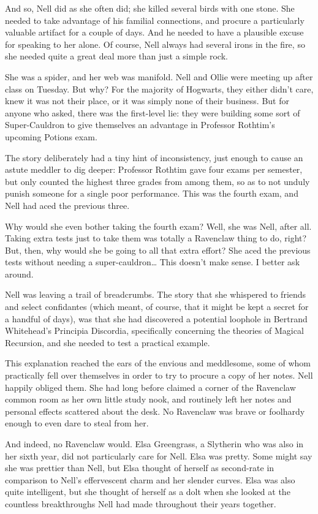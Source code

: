 And so, Nell did as she often did; she killed several birds with one stone. She needed to take advantage of his familial connections, and procure a particularly valuable artifact for a couple of days. And he needed to have a plausible excuse for speaking to her alone. Of course, Nell always had several irons in the fire, so she needed quite a great deal more than just a simple rock.

She was a spider, and her web was manifold. Nell and Ollie were meeting up after class on Tuesday. But why? For the majority of Hogwarts, they either didn’t care, knew it was not their place, or it was simply none of their business. But for anyone who asked, there was the first-level lie: they were building some sort of Super-Cauldron to give themselves an advantage in Professor Rothtim’s upcoming Potions exam.

The story deliberately had a tiny hint of inconsistency, just enough to cause an astute meddler to dig deeper: Professor Rothtim gave four exams per semester, but only counted the highest three grades from among them, so as to not unduly punish someone for a single poor performance. This was the fourth exam, and Nell had aced the previous three.

Why would she even bother taking the fourth exam? Well, she was Nell, after all. Taking extra tests just to take them was totally a Ravenclaw thing to do, right? But, then, why would she be going to all that extra effort? She aced the previous tests without needing a super-cauldron… This doesn’t make sense. I better ask around.

Nell was leaving a trail of breadcrumbs. The story that she whispered to friends and select confidantes (which meant, of course, that it might be kept a secret for a handful of days), was that she had discovered a potential loophole in Bertrand Whitehead’s Principia Discordia, specifically concerning the theories of Magical Recursion, and she needed to test a practical example.

This explanation reached the ears of the envious and meddlesome, some of whom practically fell over themselves in order to try to procure a copy of her notes. Nell happily obliged them. She had long before claimed a corner of the Ravenclaw common room as her own little study nook, and routinely left her notes and personal effects scattered about the desk. No Ravenclaw was brave or foolhardy enough to even dare to steal from her.

And indeed, no Ravenclaw would. Elsa Greengrass, a Slytherin who was also in her sixth year, did not particularly care for Nell. Elsa was pretty. Some might say she was prettier than Nell, but Elsa thought of herself as second-rate in comparison to Nell’s effervescent charm and her slender curves. Elsa was also quite intelligent, but she thought of herself as a dolt when she looked at the countless breakthroughs Nell had made throughout their years together.

